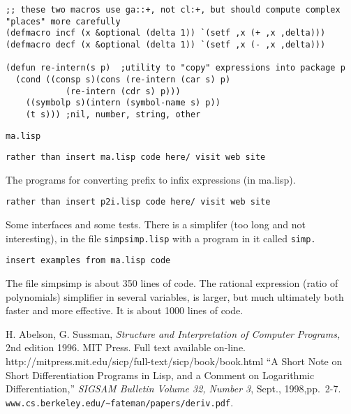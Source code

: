 \documentclass{article}
\begin{document}
{\begin{verbatim}
;; these two macros use ga::+, not cl:+, but should compute complex "places" more carefully
(defmacro incf (x &optional (delta 1)) `(setf ,x (+ ,x ,delta)))
(defmacro decf (x &optional (delta 1)) `(setf ,x (- ,x ,delta)))

(defun re-intern(s p)  ;utility to "copy" expressions into package p
  (cond	((consp s)(cons (re-intern (car s) p)
			(re-intern (cdr s) p)))
	((symbolp s)(intern (symbol-name s) p))
	(t s))) ;nil, number, string, other

\end{verbatim}
{\tt ma.lisp}
\begin{verbatim}
rather than insert ma.lisp code here/ visit web site
\end{verbatim}
The programs for converting prefix to infix expressions (in ma.lisp).
\begin{verbatim}
rather than insert p2i.lisp code here/ visit web site
\end{verbatim}
Some interfaces and some tests. There is a simplifer (too long and
not interesting), in the file {\tt simpsimp.lisp} with a program in
it called {\tt simp.}
\begin{verbatim}
insert examples from ma.lisp code
\end{verbatim}
The file simpsimp is about 350 lines of code. The rational
expression (ratio of polynomials) simplifier
in several variables, is larger, but much ultimately both
faster and more effective.  It is about 1000 lines of code.


\begin{thebibliography}{99}

H. Abelson, G. Sussman, {\em Structure and Interpretation of
Computer Programs,} 2nd edition 1996. MIT Press. Full text
available on-line.
http://mitpress.mit.edu/sicp/full-text/sicp/book/book.html
 ``A Short Note on Short Differentiation Programs in Lisp, and
a Comment on Logarithmic Differentiation,''
{\em SIGSAM Bulletin Volume 32, Number 3}, Sept., 1998,pp.~2-7.
\verb|www.cs.berkeley.edu/~fateman/papers/deriv.pdf|. 


\end{thebibliography}}
\end{document}
